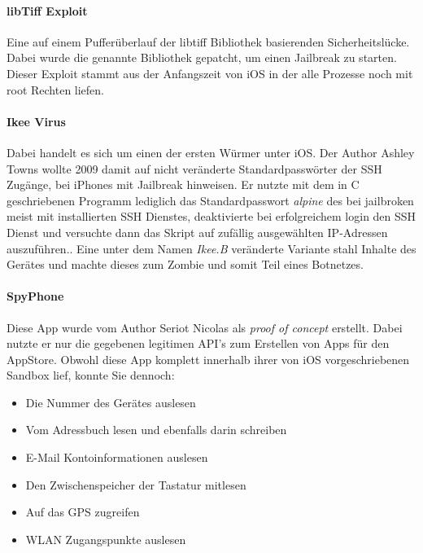 		\paragraph{libTiff Exploit} 
			Eine auf einem Pufferüberlauf der libtiff Bibliothek basierenden
			Sicherheitslücke. Dabei wurde die genannte Bibliothek gepatcht, um einen
			Jailbreak zu starten\cite{LibTiffExploit2015}. Dieser Exploit
			stammt aus der Anfangszeit von iOS in der alle Prozesse noch mit root
			Rechten liefen.
		\paragraph{Ikee Virus}\label{sec:ikee-exploit}
			Dabei handelt es sich um einen der ersten Würmer unter iOS. Der	Author Ashley Towns
			wollte 2009 damit auf nicht veränderte Standardpasswörter der SSH Zugänge,
			bei iPhones mit Jailbreak hinweisen. Er nutzte mit dem in C geschriebenen
			Programm lediglich das Standardpasswort \textsl{alpine} des bei jailbroken
			meist mit installierten SSH Dienstes, deaktivierte bei erfolgreichem login
			den SSH Dienst und versuchte dann das Skript auf zufällig ausgewählten
			IP-Adressen auszuführen.\cite{IkeeExploit2009}. Eine unter dem Namen
			\textsl{Ikee.B} veränderte Variante stahl Inhalte des Gerätes und machte
			dieses zum Zombie und somit Teil eines Botnetzes.
		\paragraph{SpyPhone}
			Diese App wurde vom Author Seriot Nicolas als
			\textsl{proof of concept} erstellt. Dabei nutzte er nur die gegebenen
			legitimen API's zum Erstellen von Apps für den AppStore. Obwohl diese App
			komplett innerhalb ihrer von iOS vorgeschriebenen Sandbox lief, konnte
			Sie dennoch:
			\begin{itemize}\itemsep0pt
				\item{Die Nummer des Gerätes auslesen}
				\item{Vom Adressbuch lesen und ebenfalls darin schreiben}
				\item{E-Mail Kontoinformationen auslesen}
				\item{Den Zwischenspeicher der Tastatur mitlesen}
				\item{Auf das GPS zugreifen}
				\item{WLAN Zugangspunkte auslesen}
			\end{itemize}
			
